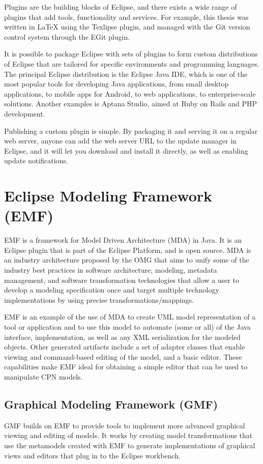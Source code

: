 Plugins are the building blocks of Eclipse, and there exists a wide range of
plugins that add tools, functionality and services. For example, this thesis
was written in \LaTeX{} using the Texlipse plugin, and managed with the Git
version control system through the EGit plugin. 

It is possible to package Eclipse with sets of plugins to form custom
distributions of Eclipse that are tailored for specific environments and
programming languages. The principal Eclipse distribution is the Eclipse Java
IDE, which is one of the most popular tools for developing Java applications, from small
desktop applications, to mobile apps for Android, to web applications, to
enterprise-scale solutions. Another examples is Aptana Studio, aimed at Ruby on
Rails and PHP development. 

Publishing a custom plugin is simple. By packaging it and serving it on a
regular web server, anyone can add the web server URL to the update manager in
Eclipse, and it will let you download and install it directly, as well as
enabling update notifications.


\section{Eclipse Modeling Framework (EMF)}
EMF is a framework for Model Driven Architecture (MDA) in Java. It is an Eclipse
plugin that is part of the Eclipse Platform, and is open source. MDA is an
industry architecture proposed by the OMG that aims to unify some of the
industry best practices in software architecture, modeling, metadata management,
and software transformation technologies that allow a user to develop a
modeling specification once and target multiple technology implementations by
using precise transformations/mappings. 

EMF is an example of the use of MDA to create UML model representation of a
tool or application and to use this model to automate (some or all) of the Java
interface, implementation, as well as any XML serialization for the modeled objects. 
Other generated artifacts include a set of adapter classes that enable
viewing and command-based editing of the model, and a basic editor. These
capabilities make EMF ideal for obtaining a simple editor that can be used to
manipulate CPN models.

	\subsection{Graphical Modeling Framework (GMF)}
	GMF builds on EMF to provide tools to implement more advanced graphical viewing
	and editing of models. It works by creating model transformations that use the
	metamodels created with EMF to generate implementations of graphical views and
	editors that plug in to the Eclipse workbench. 
	
